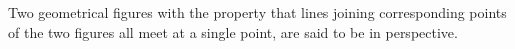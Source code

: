 Two geometrical figures with the property that lines joining 
corresponding points of the two figures all meet at a single point,
are said to be in perspective.
